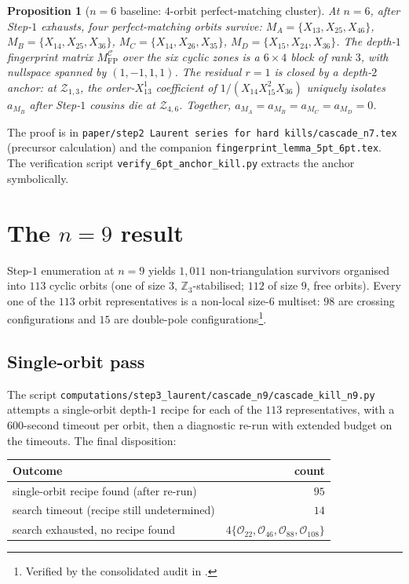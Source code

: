 \documentclass[11pt]{article}
\newtheorem{prop}[thm]{Proposition}
\theoremstyle{definition}
\begin{document}
\begin{prop}[$n=6$ baseline: $4$-orbit perfect-matching cluster]\label{prop:n6}
At $n=6$, after Step-$1$ exhausts, four perfect-matching orbits
survive:
$M_A=\{X_{13},X_{25},X_{46}\}$,
$M_B=\{X_{14},X_{25},X_{36}\}$,
$M_C=\{X_{14},X_{26},X_{35}\}$,
$M_D=\{X_{15},X_{24},X_{36}\}$.
The depth-$1$ fingerprint matrix $M_{\mathrm{FP}}^{\mathcal C}$ over
the six cyclic zones is a $6\times 4$ block of rank $3$, with
nullspace spanned by $(1,-1,1,1)$. The residual $r=1$ is closed by
a depth-$2$ anchor: at $\mathcal Z_{1,3}$, the order-$X_{13}^{1}$
coefficient of $1/(X_{14}X_{15}^{2}X_{36})$ uniquely isolates
$a_{M_B}$ after Step-$1$ cousins die at $\mathcal Z_{4,6}$.
Together, $a_{M_A}=a_{M_B}=a_{M_C}=a_{M_D}=0$.
\end{prop}

The proof is in
\verb|paper/step2 Laurent series for hard kills/cascade_n7.tex|
(precursor calculation) and the companion
\verb|fingerprint_lemma_5pt_6pt.tex|. The verification script
\verb|verify_6pt_anchor_kill.py| extracts the anchor symbolically.

\section{The $n=9$ result}\label{sec:n9}

Step-$1$ enumeration at $n=9$ yields $1{,}011$ non-triangulation
survivors organised into $113$ cyclic orbits (one of size $3$,
$\mathbb Z_3$-stabilised; $112$ of size $9$, free orbits). Every one
of the $113$ orbit representatives is a non-local size-$6$ multiset:
$98$ are crossing configurations and $15$ are double-pole
configurations\footnote{Verified by the consolidated audit in
\cite{n9status}.}.

\subsection{Single-orbit pass}\label{subsec:single}

The script
\verb|computations/step3_laurent/cascade_n9/cascade_kill_n9.py|
attempts a single-orbit depth-$1$ recipe for each of the $113$
representatives, with a $600$-second timeout per orbit, then a
diagnostic re-run with extended budget on the timeouts. The final
disposition:

\begin{center}
\begin{tabular}{lr}
\toprule
Outcome & count \\
\midrule
single-orbit recipe found (after re-run) & $95$ \\
search timeout (recipe still undetermined) & $14$ \\
search exhausted, no recipe found &
$4$\quad $\{\mathcal O_{22},\mathcal O_{46},\mathcal O_{88},\mathcal O_{108}\}$ \\
\bottomrule
\end{tabular}
\end{center}
\end{document}
